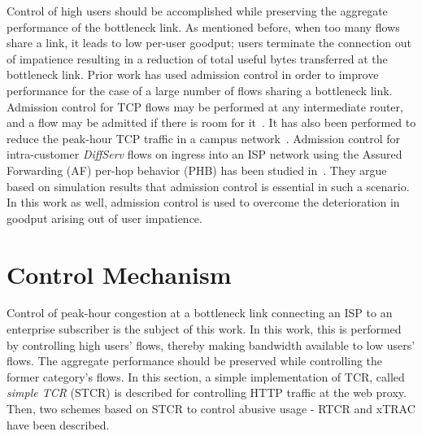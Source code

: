 \documentclass[conference]{../../IEEEtran}
\begin{document}
Control of high users should be accomplished while preserving the aggregate performance of the bottleneck link. As mentioned before, when too many flows share a link, it leads to low per-user goodput; users terminate the connection out of impatience resulting in a reduction of total useful bytes transferred at the bottleneck link. Prior work has used admission control in order to improve performance for the case of a large number of flows sharing a bottleneck link. Admission control for TCP flows may be performed at any intermediate router, and a flow may be admitted if there is room for it~\cite{references:mortier00}. It has also been performed to reduce the peak-hour TCP traffic in a campus network~\cite{references:kumar}. Admission control for intra-customer \emph{DiffServ} flows on ingress into an ISP network using the Assured Forwarding (AF) per-hop behavior (PHB) has been studied in~\cite{references:banchs02}. They argue based on simulation results that admission control is essential in such a scenario. In this work as well, admission control is used to overcome the deterioration in goodput arising out of user impatience. 


\section{Control Mechanism}
\label{sec:ctrl}

Control of peak-hour congestion at a bottleneck link connecting an ISP to an enterprise subscriber is the subject of this work. In this work, this is performed by controlling high users' flows, thereby making bandwidth available to low users' flows. The aggregate performance should be preserved while controlling the former category's flows. In this section, a simple implementation of TCR, called \emph{simple TCR} (STCR) is described for controlling HTTP traffic at the web proxy. Then, two schemes based on STCR to control abusive usage - RTCR and xTRAC have been described. 
\end{document}
